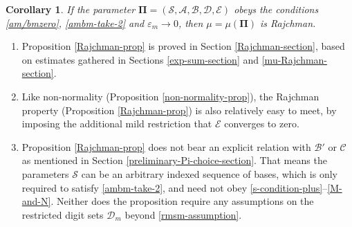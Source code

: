 \documentclass[12pt, twoside]{article}
\newtheorem{corollary}[theorem]{Corollary}
\theoremstyle{definition}
\numberwithin{equation}{section}
\begin{document}
\begin{corollary} \label{Rajchman-corollary}
If the parameter $\pmb{\Pi} = (\mathcal S, \mathcal A, \mathcal B, \mathcal D, \mathcal E)$ obeys the conditions \eqref{am/bmzero}, \eqref{ambm-take-2} and $\varepsilon_m \rightarrow 0$, then $\mu = \mu(\pmb{\Pi})$ is Rajchman.  
\end{corollary} 
\begin{enumerate}[1.] 
\item Proposition \ref{Rajchman-prop} is proved in Section \ref{Rajchman-section}, based on estimates gathered in Sections \ref{exp-sum-section} and \ref{mu-Rajchman-section}.
\item Like non-normality (Proposition \ref{non-normality-prop}), the Rajchman property (Proposition \ref{Rajchman-prop}) is also relatively easy to meet, by imposing the additional mild restriction that $\mathcal E$ converges to zero.  
\item \label{remark-Rajchman} Proposition \ref{Rajchman-prop} does not bear an explicit relation with $\mathscr{B}'$ or $\mathscr{C}$ as mentioned in Section \ref{preliminary-Pi-choice-section}. That means the parameters $\mathcal{S}$ can be an arbitrary indexed sequence of bases, which is only required to satisfy \eqref{ambm-take-2}, and need not obey \eqref{s-condition-plus}--\eqref{M-and-N}.  Neither does the proposition require any assumptions on the restricted digit sets $\mathscr{D}_m$ beyond \eqref{rmsm-assumption}.
\end{enumerate}
\end{document}
